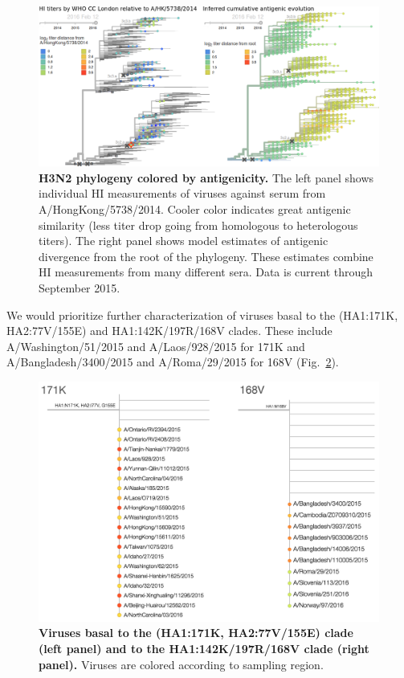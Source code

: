 \documentclass[11pt,oneside,letterpaper]{article}
\begin{document}
\begin{figure}[h!]
	\centering		
	\includegraphics[width=1.0\textwidth]{../figures/feb-2016/H3N2_HI.png}
	\caption{\textbf{H3N2 phylogeny colored by antigenicity.}
	The left panel shows individual HI measurements of viruses against serum from A/HongKong/5738/2014.
	Cooler color indicates great antigenic similarity (less titer drop going from homologous to heterologous titers).
	The right panel shows model estimates of antigenic divergence from the root of the phylogeny.
	These estimates combine HI measurements from many different sera.
	Data is current through September 2015.
	}
	\label{H3N2_HI}
\end{figure}

\pagebreak

We would prioritize further characterization of viruses basal to the (HA1:171K, HA2:77V/155E) and HA1:142K/197R/168V clades. These include A/Washington/51/2015 and A/Laos/928/2015 for 171K and A/Bangladesh/3400/2015 and A/Roma/29/2015 for 168V (Fig.\ \ref{H3N2_basal_viruses}).

\begin{figure}[h!]
	\centering		
	\includegraphics[width=1.0\textwidth]{../figures/feb-2016/H3N2_basal_viruses.png}
	\caption{\textbf{Viruses basal to the (HA1:171K, HA2:77V/155E) clade (left panel) and to the HA1:142K/197R/168V clade (right panel).}
	Viruses are colored according to sampling region.
	}
	\label{H3N2_basal_viruses}
\end{figure}
\end{document}
